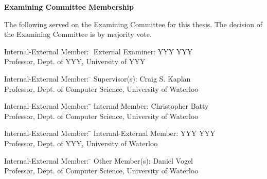 \cleardoublepage %

 
\begin{center}\textbf{Examining Committee Membership}\end{center}
  \noindent
The following served on the Examining Committee for this thesis. The decision of the Examining Committee is by majority vote.
  \bigskip
  
  \noindent
\begin{tabbing}
Internal-External Member: \=  \kill %
External Examiner: \>  YYY YYY \\ 
\> Professor, Dept. of YYY, University of YYY \\
\end{tabbing} 
  \bigskip
  
  \noindent
\begin{tabbing}
Internal-External Member: \=  \kill %
Supervisor(s): \> Craig S. Kaplan \\
\> Professor, Dept. of Computer Science, University of Waterloo \\
\end{tabbing}
  \bigskip
  
  \noindent
  \begin{tabbing}
Internal-External Member: \=  \kill %
Internal Member: \> Christopher Batty \\
\> Professor, Dept. of Computer Science, University of Waterloo \\
\end{tabbing}
  \bigskip
  
  \noindent
\begin{tabbing}
Internal-External Member: \=  \kill %
Internal-External Member: \> YYY YYY \\
\> Professor, Dept. of YYY, University of Waterloo \\
\end{tabbing}
  \bigskip
  
  \noindent
\begin{tabbing}
Internal-External Member: \=  \kill %
Other Member(s): \> Daniel Vogel \\
\> Professor, Dept. of Computer Science, University of Waterloo \\
\end{tabbing}

